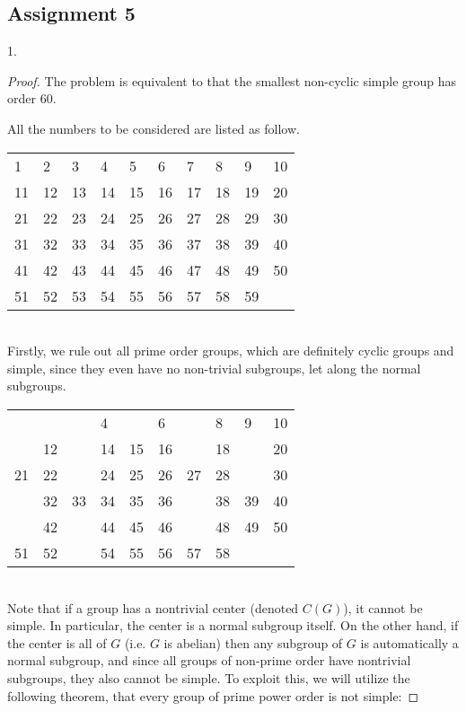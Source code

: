 \subsection{Assignment 5}

\begin{exercise}
    1.
\end{exercise}

\begin{proof}
    The problem is equivalent to that the smallest non-cyclic simple group has order 60.

    All the numbers to be considered are listed as follow.\\

    \begin{tabular}{llllllllll}
    \toprule
    1  & 2  & 3  & 4  & 5  & 6  & 7  & 8  & 9  & 10 \\ 
    11 & 12 & 13 & 14 & 15 & 16 & 17 & 18 & 19 & 20 \\
    21 & 22 & 23 & 24 & 25 & 26 & 27 & 28 & 29 & 30 \\
    31 & 32 & 33 & 34 & 35 & 36 & 37 & 38 & 39 & 40 \\
    41 & 42 & 43 & 44 & 45 & 46 & 47 & 48 & 49 & 50 \\
    51 & 52 & 53 & 54 & 55 & 56 & 57 & 58 & 59 &    \\ \bottomrule
    \end{tabular}\\

    Firstly, we rule out all prime order groups, which are definitely cyclic groups and simple, since they even have no non-trivial subgroups, let along the normal subgroups.\\

    \begin{tabular}{llllllllll}
        \toprule
          &   &   & 4  &   & 6  &   & 8  & 9  & 10 \\ 
         & 12 &  & 14 & 15 & 16 &  & 18 &  & 20 \\
        21 & 22 &  & 24 & 25 & 26 & 27 & 28 &  & 30 \\
         & 32 & 33 & 34 & 35 & 36 &  & 38 & 39 & 40 \\
         & 42 &  & 44 & 45 & 46 &  & 48 & 49 & 50 \\
        51 & 52 &  & 54 & 55 & 56 & 57 & 58 &  &    \\ \bottomrule
    \end{tabular}\\

    Note that if a group has a nontrivial center (denoted $C(G)$), it cannot be simple. In particular, the center is a normal subgroup itself. On the other hand, if the center is all of $G$ (i.e. $G$ is abelian) then any subgroup of $G$ is automatically a normal subgroup, and since all groups of non-prime order have nontrivial subgroups, they also cannot be simple. To exploit this, we will utilize the following theorem, that every group of prime power order is not simple:



\end{proof}
